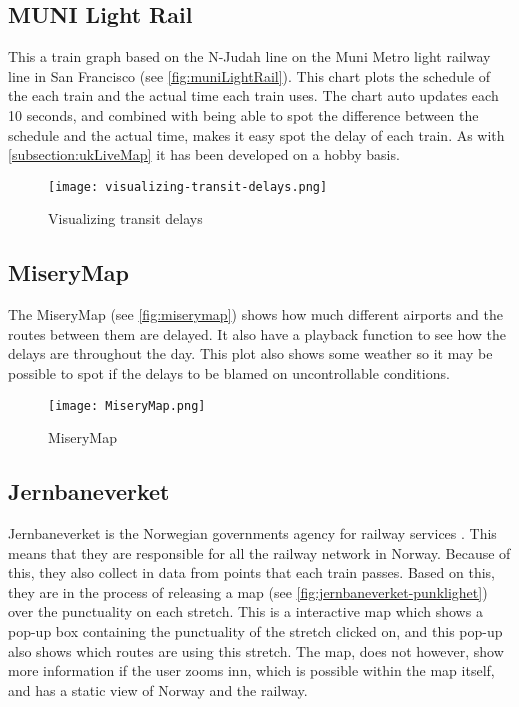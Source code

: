 \subsection{MUNI Light Rail}
\label{subsection:muniLightRail}

This a train graph based on the N-Judah line on the Muni Metro light railway line in San Francisco (see \vref{fig:muniLightRail}). 
This chart plots the schedule of the each train and the actual time each train 
uses. The chart auto updates each 10 seconds, and combined with being able 
to spot the difference between the schedule and the actual time, makes it easy 
spot the delay of each train. As with \vref{subsection:ukLiveMap} it has been 
developed on a hobby basis.

\begin{figure}[!htbp]
	\texttt{[image: visualizing-transit-delays.png]}
	\caption[Visualizing transit delays]{Visualizing transit delays \cite{muniLightRail}}
	\label{fig:muniLightRail}
\end{figure}
\pagebreak


\subsection{MiseryMap}
\label{subsection:zugmonitor}

The MiseryMap (see \vref{fig:miserymap}) shows how much different airports and 
the routes between them are delayed. It also have a playback function to see
how the delays are throughout the day. This plot also shows some weather so it
may be possible to spot if the delays to be blamed on uncontrollable
conditions. 

\begin{figure}[!htbp]
	\texttt{[image: MiseryMap.png]}
	\caption[MiseryMap]{MiseryMap \cite{flightAware:MiseryMap}}
	\label{fig:miserymap}
\end{figure}
 
\subsection{Jernbaneverket}
\label{subsection:jernbaneverket}

Jernbaneverket is the Norwegian governments agency for railway services \cite{jernbaneverketAbout}.
This means that they are responsible for all the railway network in Norway.
Because of this, they also collect in data from points that each train passes. 
Based on this, they are in the process of releasing a map (see \vref{fig:jernbaneverket-punklighet}) over the punctuality on each stretch. This is a 
interactive map which shows a pop-up box containing the punctuality of the 
stretch clicked on, and this pop-up also shows which routes are using this 
stretch. The map, does not however, show more information if the user zooms 
inn, which is possible within the map itself, and has a static view of Norway 
and the railway.

